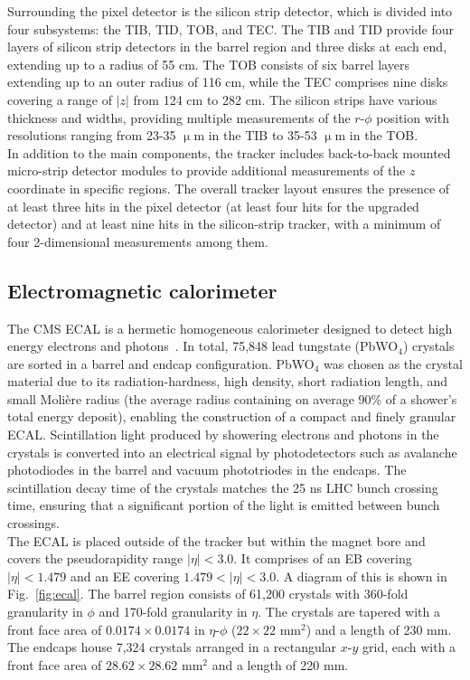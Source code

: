 Surrounding the pixel detector is the silicon strip detector, which is divided into four subsystems: the \ac{TIB}, \ac{TID}, \ac{TOB}, and \ac{TEC}. 
The \ac{TIB} and \ac{TID} provide four layers of silicon strip detectors in the barrel region and three disks at each end, extending up to a radius of 55 cm. 
The \ac{TOB} consists of six barrel layers extending up to an outer radius of 116 cm, while the \ac{TEC} comprises nine disks covering a range of $|z|$ from 124 cm to 282 cm. 
The silicon strips have various thickness and widths, providing multiple measurements of the $r$-$\phi$ position with resolutions ranging from 23-35 $\upmu$m in the \ac{TIB} to 35-53 $\upmu$m in the \ac{TOB}. \\

In addition to the main components, the tracker includes back-to-back mounted micro-strip detector modules to provide additional measurements of the $z$ coordinate in specific regions. 
The overall tracker layout ensures the presence of at least three hits in the pixel detector (at least four hits for the upgraded detector) and at least nine hits in the silicon-strip tracker, with a minimum of four 2-dimensional measurements among them.

\subsection{Electromagnetic calorimeter}

The \ac{CMS} \ac{ECAL} is a hermetic homogeneous calorimeter designed to detect high energy electrons and photons~\cite{CMS_Setup,CMS:2013lxn}. 
In total, 75,848 lead tungstate (PbWO$_4$) crystals are sorted in a barrel and endcap configuration. 
PbWO$_4$ was chosen as the crystal material due to its radiation-hardness, high density, short radiation length, and small Molière radius (the average radius containing on average 90\% of
a shower’s total energy deposit), enabling the construction of a compact and finely granular \ac{ECAL}. 
Scintillation light produced by showering electrons and photons in the crystals is converted into an electrical signal by photodetectors such as avalanche photodiodes in the barrel and vacuum phototriodes in the endcaps. 
The scintillation decay time of the crystals matches the 25 ns \ac{LHC} bunch crossing time, ensuring that a significant portion of the light is emitted between bunch crossings. \\

The \ac{ECAL} is placed outside of the tracker but within the magnet bore and covers the pseudorapidity range $|\eta| < 3.0$. 
It comprises of an \ac{EB} covering $|\eta| < 1.479$ and an \ac{EE} covering $1.479 < |\eta| < 3.0$. 
A diagram of this is shown in Fig.~\ref{fig:ecal}.
The barrel region consists of 61,200 crystals with 360-fold granularity in $\phi$ and 170-fold granularity in $\eta$. 
The crystals are tapered with a front face area of $0.0174 \times 0.0174$ in $\eta$-$\phi$ ($22 \times 22$ mm$^2$) and a length of 230 mm. 
The endcaps house 7,324 crystals arranged in a rectangular $x$-$y$ grid, each with a front face area of $28.62 \times 28.62$ mm$^2$ and a length of 220 mm. \\

